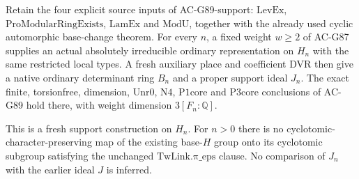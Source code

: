\begin{theorem}
\label{thm:G91-host}
Retain the four explicit source inputs of AC-G89-support:
$\mathrm{LevEx}$, $\mathrm{ProModularRingExists}$,
$\mathrm{LamEx}$ and $\mathrm{ModU}$, together with the
already used cyclic automorphic base-change theorem.
For every $n$, a fixed weight $w\geq2$ of AC-G87 supplies
an actual absolutely irreducible ordinary representation on
$H_n$ with the same restricted local types.
A fresh auxiliary place and coefficient DVR then give a native
ordinary determinant ring $B_n$ and a proper support ideal $J_n$.
The exact finite, torsionfree, dimension, $\mathrm{Unr0}$,
$\mathrm{N4}$, $\mathrm{P1core}$ and $\mathrm{P3core}$ conclusions
of AC-G89 hold there, with weight dimension $3[F_n:\mathbb Q]$.

This is a fresh support construction on $H_n$.  For $n>0$
there is no cyclotomic-character-preserving map of the existing
base-$H$ group onto its cyclotomic subgroup satisfying the
unchanged $\mathrm{TwLink.\pi\_eps}$ clause.  No comparison
of $J_n$ with the earlier ideal $J$ is inferred.
\end{theorem}


